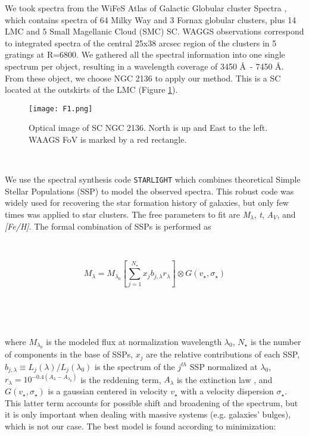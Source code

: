 \documentclass[baaa]{baaa}
\begin{document}
We took spectra from the WiFeS Atlas of Galactic Globular cluster Spectra {\citep{WWAGGS},} which contains spectra of 64 Milky Way and 3 Fornax globular clusters, plus 14 LMC and 5 Small Magellanic Cloud (SMC) SC. WAGGS observations correspond to integrated spectra of the central 25x38 arcsec region of the clusters in 5 gratings at R=6800. We gathered all the spectral information into one single spectrum per object, resulting in a wavelength coverage of 3450 \AA\ - 7450 \AA. From these object, we choose NGC 2136 to apply our method. This is a SC located at the outskirts of the LMC (Figure \ref{image}).

\begin{figure}[!t]
\centering
\texttt{[image: F1.png]}
\caption{Optical image of SC NGC 2136. North is up and East to the left. WAAGS FoV is marked by a red rectangle.}
\label{image}
\end{figure}

\

We use the spectral synthesis code {\tt STARLIGHT} \citep{Cid} which combines theoretical Simple Stellar Populations (SSP) to model the observed spectra. This robust code was widely used for recovering the star formation history of galaxies, but only few times was applied to star clusters. The free parameters to fit are {\it M$_\lambda$}, {\it t}, {\it A$_V$}, and {\it [Fe/H]}. The formal combination of SSPs is performed as

\

\begin{equation}
\label{eq:Stl_02}
M_\lambda = M_{\lambda_0} \left[\sum_{j=1}^{N_\star} x_j b_{j,\lambda}
  r_\lambda \right] \otimes G(v_\star,\sigma_\star)
\end{equation}

\

\


where $M_{\lambda_0}$ is the modeled flux at normalization wavelength $\lambda_0$, $N_\star$ is the number of components in the base of SSPs, $x_j$ are the relative contributions of each SSP, $b_{j,\lambda} \equiv L_j(\lambda) / L_j(\lambda_0)$ is the spectrum of the $j^{th}$ SSP normalized at $\lambda_0$, $r_\lambda = 10^{-0.4(A_\lambda-A_{\lambda_0})}$ is the reddening term, $A_\lambda$ is the extinction law \citep{CCM}, and $G(v_\star,\sigma_\star)$ is a gaussian centered in velocity $v_\star$ with a velocity dispersion $\sigma_\star$. This latter term accounts for possible shift and broadening of the spectrum, but it is only important when dealing with massive systems (e.g. galaxies' bulges), which is not our case. The best model is found according to minimization:
\end{document}
